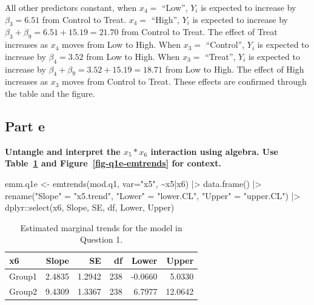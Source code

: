 \documentclass[
]{article}
\newenvironment{Shaded}{\begin{snugshade}}{\end{snugshade}}
\newcommand{\AttributeTok}[1]{\textcolor[rgb]{0.40,0.45,0.13}{#1}}
\newcommand{\FunctionTok}[1]{\textcolor[rgb]{0.28,0.35,0.67}{#1}}
\newcommand{\NormalTok}[1]{\textcolor[rgb]{0.00,0.23,0.31}{#1}}
\newcommand{\OtherTok}[1]{\textcolor[rgb]{0.00,0.23,0.31}{#1}}
\newcommand{\SpecialCharTok}[1]{\textcolor[rgb]{0.37,0.37,0.37}{#1}}
\newcommand{\StringTok}[1]{\textcolor[rgb]{0.13,0.47,0.30}{#1}}
\begin{document}
All other predictors constant, when \(x_4 =\) ``Low'', \(Y_i\) is
expected to increase by \(\beta_3 = 6.51\) from Control to Treat.
\(x_4 =\) ``High'', \(Y_i\) is expected to increase by
\(\beta_3 + \beta_9 = 6.51 + 15.19 = 21.70\) from Control to Treat. The
effect of Treat increases as \(x_4\) moves from Low to High. When
\(x_3 =\) ``Control'', \(Y_i\) is expected to increase by
\(\beta_4 = 3.52\) from Low to High. When \(x_3 =\) ``Treat'', \(Y_i\)
is expected to increase by \(\beta_4 + \beta_9 = 3.52 + 15.19 = 18.71\)
from Low to High. The effect of High increases as \(x_3\) moves from
Control to Treat. These effects are confirmed through the table and the
figure.

\subsection{Part e}\label{part-e}

\textbf{Untangle and interpret the \(x_5*x_6\) interaction using
algebra. Use Table~\ref{tbl-q1e-emtrends} and
Figure~\ref{fig-q1e-emtrends} for context.}

\scriptsize

\begin{Shaded}
\begin{Highlighting}[numbers=left,,]
\NormalTok{emm.q1e }\OtherTok{\textless{}{-}} \FunctionTok{emtrends}\NormalTok{(mod.q1, }\AttributeTok{var=}\StringTok{"x5"}\NormalTok{, }\SpecialCharTok{\textasciitilde{}}\NormalTok{x5}\SpecialCharTok{|}\NormalTok{x6) }\SpecialCharTok{|\textgreater{}} 
            \FunctionTok{data.frame}\NormalTok{() }\SpecialCharTok{|\textgreater{}}
            \FunctionTok{rename}\NormalTok{(}\StringTok{"Slope"}  \OtherTok{=} \StringTok{"x5.trend"}\NormalTok{,}
                   \StringTok{"Lower"} \OtherTok{=} \StringTok{"lower.CL"}\NormalTok{,}
                   \StringTok{"Upper"} \OtherTok{=} \StringTok{"upper.CL"}\NormalTok{) }\SpecialCharTok{|\textgreater{}}
\NormalTok{            dplyr}\SpecialCharTok{::}\FunctionTok{select}\NormalTok{(x6, Slope, SE, df, Lower, Upper)}
\end{Highlighting}
\end{Shaded}

\normalsize

\normalsize

{

\begin{longtable}[]{@{}lrrrrr@{}}

\caption{\label{tbl-q1e-emtrends}Estimated marginal trends for the model
in Question 1.}

\tabularnewline

\toprule\noalign{}
x6 & Slope & SE & df & Lower & Upper \\
\midrule\noalign{}
\endhead
\bottomrule\noalign{}
\endlastfoot
Group1 & 2.4835 & 1.2942 & 238 & -0.0660 & 5.0330 \\
Group2 & 9.4309 & 1.3367 & 238 & 6.7977 & 12.0642 \\

\end{longtable}

}
\end{document}
